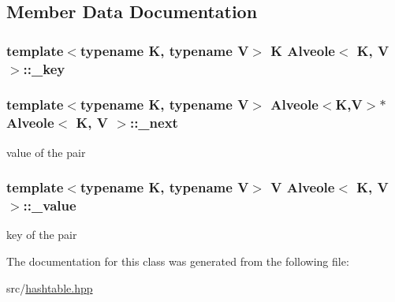 \subsection{Member Data Documentation}
\hypertarget{class_alveole_aebb26347bcaaaf2c0cbe96903b63bc70}{
\subsubsection[{\-\_\-key}]{\setlength{\rightskip}{0pt plus 5cm}template$<$typename K, typename V$>$ {\bf K} {\bf Alveole}$<$ {\bf K}, {\bf V} $>$\-::\-\_\-key\hspace{0.3cm}{\ttfamily [private]}}}\label{class_alveole_aebb26347bcaaaf2c0cbe96903b63bc70}
\hypertarget{class_alveole_aa566b7335f9ef0dc83ad2a596e659f90}{
\subsubsection[{\-\_\-next}]{\setlength{\rightskip}{0pt plus 5cm}template$<$typename K, typename V$>$ {\bf Alveole}$<${\bf K},{\bf V}$>$$\ast$ {\bf Alveole}$<$ {\bf K}, {\bf V} $>$\-::\-\_\-next\hspace{0.3cm}{\ttfamily [private]}}}\label{class_alveole_aa566b7335f9ef0dc83ad2a596e659f90}
value of the pair \hypertarget{class_alveole_a50952a1693019a7ca857df267c047c84}{
\subsubsection[{\-\_\-value}]{\setlength{\rightskip}{0pt plus 5cm}template$<$typename K, typename V$>$ {\bf V} {\bf Alveole}$<$ {\bf K}, {\bf V} $>$\-::\-\_\-value\hspace{0.3cm}{\ttfamily [private]}}}\label{class_alveole_a50952a1693019a7ca857df267c047c84}
key of the pair 

The documentation for this class was generated from the following file\-:\begin{DoxyCompactItemize}
\item 
src/\hyperlink{hashtable_8hpp}{hashtable.\-hpp}\end{DoxyCompactItemize}
